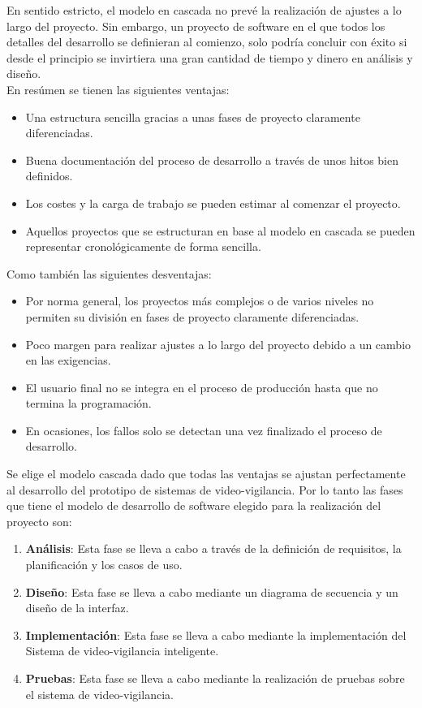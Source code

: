 En sentido estricto, el modelo en cascada no prevé la realización de ajustes a lo largo del proyecto. Sin embargo, un proyecto de software en el que todos los detalles del desarrollo se definieran al comienzo, solo podría concluir con éxito si desde el principio se invirtiera una gran cantidad de tiempo y dinero en análisis y diseño.\\

En resúmen se tienen las siguientes ventajas: 
\begin{itemize}
    \item Una estructura sencilla gracias a unas fases de proyecto claramente diferenciadas.
    \item Buena documentación del proceso de desarrollo a través de unos hitos bien definidos.
    \item Los costes y la carga de trabajo se pueden estimar al comenzar el proyecto.
    \item Aquellos proyectos que se estructuran en base al modelo en cascada se pueden representar cronológicamente de forma sencilla.
\end{itemize}

Como también las siguientes desventajas:
\begin{itemize}
    \item  Por norma general, los proyectos más complejos o de varios niveles no permiten su división en fases de proyecto claramente diferenciadas.
    \item Poco margen para realizar ajustes a lo largo del proyecto debido a un cambio en las exigencias.
    \item El usuario final no se integra en el proceso de producción hasta que no termina la programación.
    \item En ocasiones, los fallos solo se detectan una vez finalizado el proceso de desarrollo.
\end{itemize}

Se elige el modelo cascada dado que todas las ventajas se ajustan perfectamente al desarrollo del prototipo de sistemas de video-vigilancia. Por lo tanto las fases que tiene el modelo de desarrollo de software elegido para la realización del proyecto son:

\begin{enumerate}
    \item \textbf{Análisis}: Esta fase se lleva a cabo a través de la definición de requisitos, la planificación y los casos de uso.
    \item \textbf{Diseño}: Esta fase se lleva a cabo mediante un diagrama de secuencia y un diseño de la interfaz.
    \item \textbf{Implementación}: Esta fase se lleva a cabo mediante la implementación del Sistema de video-vigilancia inteligente.
    \item \textbf{Pruebas}: Esta fase se lleva a cabo mediante la realización de pruebas sobre el sistema de video-vigilancia.
\end{enumerate}
